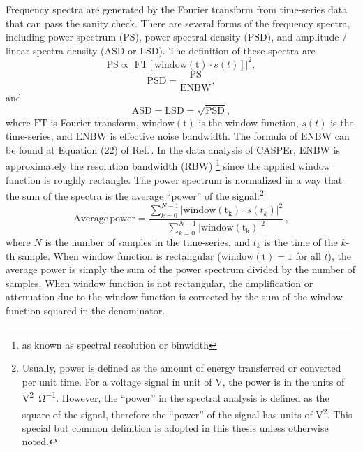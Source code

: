 Frequency spectra are generated by the Fourier transform from time-series data that can pass the sanity check. 
There are several forms of the frequency spectra, including power spectrum (PS), power spectral density (PSD), and amplitude / linear spectra density (ASD or LSD). 
The definition of these spectra are
\begin{equation}
    \mathrm{PS} \propto \left|\mathrm{FT}[\mathrm{window(t)} \cdot s(t)]\right|^2, 
\end{equation}
\begin{equation}
    \mathrm{PSD} = \frac{\mathrm{PS}}{\mathrm{ENBW}}, 
\end{equation}
and
\begin{equation}
    \mathrm{ASD} = \mathrm{LSD} = \sqrt{\mathrm{PSD}}, 
\end{equation}
where $\mathrm{FT}$ is Fourier transform, $\mathrm{window(t)}$ is the window function, $s(t)$ is the time-series, and $\mathrm{ENBW}$ is effective noise bandwidth. 
The formula of $\mathrm{ENBW}$ can be found at Equation (22) of Ref.\,\cite{Heinzel2002_SpectrumSpectralDensity}. 
In the data analysis of CASPEr, $\mathrm{ENBW}$ is approximately the resolution bandwidth (RBW) \footnote{as known as spectral resolution or binwidth} since the applied window function is roughly rectangle. 
The power spectrum is normalized in a way that the sum of the spectra is the average ``power'' of the signal:\footnote{Usually, power is defined as the amount of energy transferred or converted per unit time. For a voltage signal in unit of \unit{\volt}, the power is in the units of \unit{\volt^2\per\ohm}. However, the ``power'' in the spectral analysis is defined as the square of the signal, therefore the ``power'' of the signal has units of \unit{\volt^2}. This special but common definition is adopted in this thesis unless otherwise noted. } 
\begin{equation}
    \mathrm{Average\,power} = \frac{\sum_{k=0}^{N-1}\left|\mathrm{window(t_k)} \cdot s(t_k)\right|^2}{\sum_{k=0}^{N-1}\left|\mathrm{window(t_k)}\right|^2}\,,
\end{equation}
where $N$ is the number of samples in the time-series, and $t_k$ is the time of the $k$-th sample. 
When window function is rectangular ($\mathrm{window(t)} = 1$ for all $t$), the average power is simply the sum of the power spectrum divided by the number of samples.
When window function is not rectangular, the amplification or attenuation due to the window function is corrected by the sum of the window function squared in the denominator.

